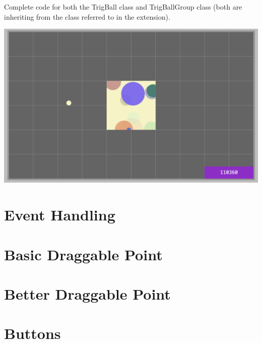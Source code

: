 \documentclass[a4paper,12pt]{article}
\begin{document}
\vspace{1cm}
Complete code for both the TrigBall class and TrigBallGroup class (both are inheriting from the class referred to in the extension).

\begin{center}
	\includegraphics[width=18cm, angle=0, origin=c]{animation_frame_interpolation/trig_balls.png}
\end{center}



\section{Event Handling}
\section{Basic Draggable Point}

\section{Better Draggable Point}





\section{Buttons}
\end{document}
